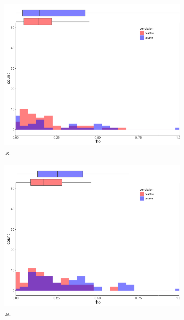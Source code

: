 \begin{figure}
\begin{subfigure}[b]{0.5\textwidth}
        \label{fig:.}
    \end{subfigure}
\begin{subfigure}[b]{0.4\textwidth}
        \includegraphics[width = 1\textwidth]{figures/combinedplotOD_ds.pdf}
        \caption{.s.}
        \label{fig:.}
    \end{subfigure}
\begin{subfigure}[b]{0.4\textwidth}
        \includegraphics[width = 1\textwidth]{figures/combinedplotOD_ws.pdf}
        \caption{.s.}
        \label{fig:.}
    \end{subfigure}
\begin{subfigure}[b]{0.4\textwidth}

\end{subfigure}
\end{figure}
